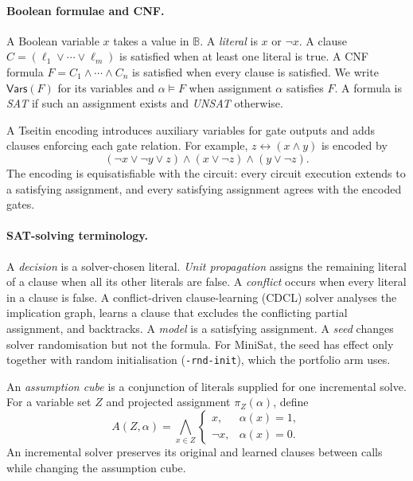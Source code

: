 \documentclass[11pt,a4paper]{article}
\newcommand{\flag}[1]{\texttt{#1}}
\begin{document}
\paragraph{Boolean formulae and CNF.}
A Boolean variable $x$ takes a value in $\mathbb B$. A \emph{literal} is $x$ or $\neg x$. A clause
$C=(\ell_1\vee\cdots\vee\ell_m)$ is satisfied when at least one literal is true. A CNF formula
$F=C_1\wedge\cdots\wedge C_n$ is satisfied when every clause is satisfied. We write
$\mathsf{Vars}(F)$ for its variables and $\alpha\models F$ when assignment $\alpha$ satisfies $F$.
A formula is \emph{SAT} if such an assignment exists and \emph{UNSAT} otherwise.

A Tseitin encoding introduces auxiliary variables for gate outputs and adds clauses enforcing each
gate relation. For example, $z\leftrightarrow(x\wedge y)$ is encoded by
\[
  (\neg x\vee\neg y\vee z)\wedge(x\vee\neg z)\wedge(y\vee\neg z).
\]
The encoding is equisatisfiable with the circuit: every circuit execution extends to a satisfying
assignment, and every satisfying assignment agrees with the encoded gates.

\paragraph{SAT-solving terminology.}
A \emph{decision} is a solver-chosen literal. \emph{Unit propagation} assigns the remaining literal
of a clause when all its other literals are false. A \emph{conflict} occurs when every literal in a
clause is false. A conflict-driven clause-learning (CDCL) solver analyses the implication graph,
learns a clause that excludes the conflicting partial assignment, and backtracks. A \emph{model} is
a satisfying assignment. A \emph{seed} changes solver randomisation but not the formula. For MiniSat, the seed has effect
only together with random initialisation (\flag{-rnd-init}), which the portfolio arm uses.

An \emph{assumption cube} is a conjunction of literals supplied for one incremental solve. For a
variable set $Z$ and projected assignment $\pi_Z(\alpha)$, define
\[
 A(Z,\alpha)=\bigwedge_{x\in Z}\begin{cases}
 x,&\alpha(x)=1,\\
 \neg x,&\alpha(x)=0.
 \end{cases}
\]
An incremental solver preserves its original and learned clauses between calls while changing the
assumption cube.
\end{document}
